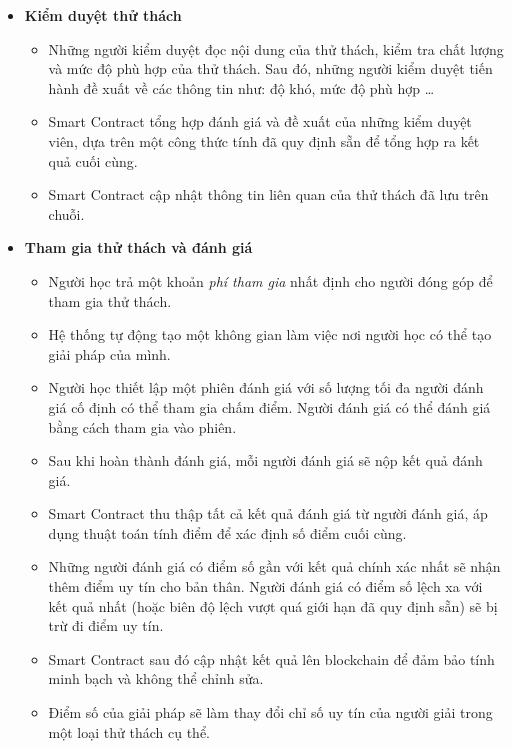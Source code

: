 \documentclass{article}[14pt]
\begin{document}
{\begin{enumerate}[label=\textbf{\alph*.}]
\begin{itemize}
                \item \textbf{Kiểm duyệt thử thách}
                      \begin{itemize}
                          \item Những người kiểm duyệt đọc nội dung của thử thách, kiểm tra chất lượng và mức độ phù hợp của thử thách. Sau đó, những người kiểm duyệt tiến hành đề xuất về các thông tin như: độ khó, mức độ phù hợp \dots
                          \item Smart Contract tổng hợp đánh giá và đề xuất của những kiểm duyệt viên, dựa trên một công thức tính đã quy định sẵn để tổng hợp ra kết quả cuối cùng.
                          \item Smart Contract cập nhật thông tin liên quan của thử thách đã lưu trên chuỗi.
                      \end{itemize}

                \item \textbf{Tham gia thử thách và đánh giá}
                      \begin{itemize}
                          \item Người học trả một khoản \textit{phí tham gia} nhất định cho người đóng góp để tham gia thử thách.
                          \item Hệ thống tự động tạo một không gian làm việc nơi người học có thể tạo giải pháp của mình.
                          \item Người học thiết lập một phiên đánh giá với số lượng tối đa người đánh giá cố định có thể tham gia chấm điểm. Người đánh giá có thể đánh giá bằng cách tham gia vào phiên.
                          \item Sau khi hoàn thành đánh giá, mỗi người đánh giá sẽ nộp kết quả đánh giá.
                          \item Smart Contract thu thập tất cả kết quả đánh giá từ người đánh giá, áp dụng thuật toán tính điểm để xác định số điểm cuối cùng.
                          \item Những người đánh giá có điểm số gần với kết quả chính xác nhất sẽ nhận thêm điểm uy tín cho bản thân. Người đánh giá có điểm số lệch xa với kết quả nhất (hoặc biên độ lệch vượt quá giới hạn đã quy định sẵn) sẽ bị trừ đi điểm uy tín.
                          \item Smart Contract sau đó cập nhật kết quả lên blockchain để đảm bảo tính minh bạch và không thể chỉnh sửa.
                          \item Điểm số của giải pháp sẽ làm thay đổi chỉ số uy tín của người giải trong một loại thử thách cụ thể.
                      \end{itemize}


\end{itemize}
\end{enumerate}}
\end{document}
